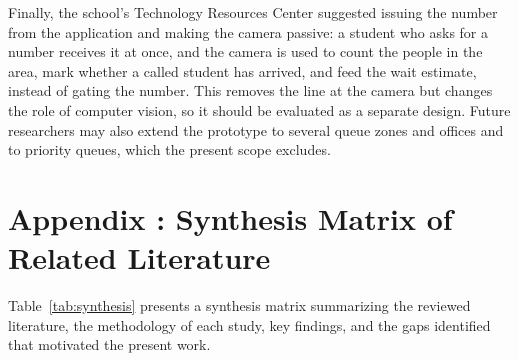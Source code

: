 \documentclass{research}
\begin{document}
Finally, the school's Technology Resources Center suggested issuing the
number from the application and making the camera passive: a student who
asks for a number receives it at once, and the camera is used to count
the people in the area, mark whether a called student has arrived, and
feed the wait estimate, instead of gating the number. This removes the
line at the camera but changes the role of computer vision, so it should
be evaluated as a separate design. Future researchers may also extend the
prototype to several queue zones and offices and to priority queues,
which the present scope excludes.

\appendix
{}
\setcounter{section}{0}
\setcounter{table}{0}
\chapter*{Appendix \thechapter: Synthesis Matrix of Related Literature}
\label{app:synthesis-matrix}

Table~\ref{tab:synthesis} presents a synthesis matrix summarizing the
reviewed literature, the methodology of each study, key findings, and
the gaps identified that motivated the present work.
\end{document}
